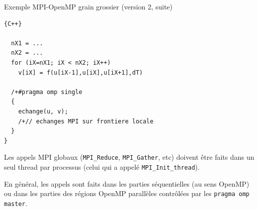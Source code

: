 \documentclass{beamer}
\begin{document}
\begin{frame}[fragile]
	Exemple MPI-OpenMP grain grossier (version 2, suite)
	
	
	\begin{lstlisting}[firstnumber=14]{C++}
	
  nX1 = ...
  nX2 = ...
  for (iX=nX1; iX < nX2; iX++)
    v[iX] = f(u[iX-1],u[iX],u[iX+1],dT)

  /+#pragma omp single
  {
    echange(u, v);
    /+// echanges MPI sur frontiere locale    
  }
}
\end{lstlisting}
	
\end{frame}

\begin{frame}
	Les appels MPI globaux (\texttt{MPI\_Reduce}, \texttt{MPI\_Gather}, etc)
	doivent être faits dans un seul thread par processus (celui qui a appelé \texttt{MPI\_Init\_thread}).
	
	\bigskip
	En général, les appels sont faits dans les parties séquentielles (au sens OpenMP) ou dans les parties des régions OpenMP parallèles contrôlées par les \texttt{pragma omp master}. 
\end{frame}
\end{document}

